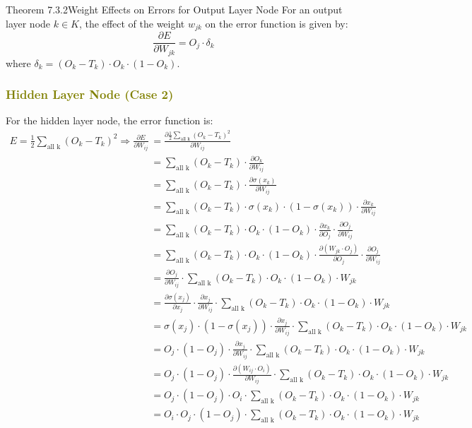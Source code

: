 \documentclass{book}
\begin{document}
\begin{thmBox}{Theorem 7.3.2}{Weight Effects on Errors for Output Layer Node}
    For an output layer node \(k \in K\), the effect of the weight \(w_{jk}\) on the error function is given by:
    \[
        \frac{\partial E}{\partial W_{jk}} =  O_j \cdot \delta_k
    \]
    where \(\delta_k = (O_k - T_k) \cdot O_k \cdot (1 - O_k)\).
\end{thmBox}
\newpage
\textcolor{olive}{\subsubsection{Hidden Layer Node (Case 2)}}
For the hidden layer node, the error function is:
\begin{align*}
    E = \frac{1}{2} \sum_{\text{all k}} (O_k - T_k)^2 \Rightarrow \frac{\partial E}{\partial W_{ij}} &= \frac{\partial \frac{1}{2} \sum_{\text{all k}} (O_k - T_k)^2}{\partial W_{ij}}\\
    &= \sum_{\text{all k}} (O_k - T_k) \cdot \frac{\partial O_k}{\partial W_{ij}}\\
    &= \sum_{\text{all k}} (O_k - T_k) \cdot \frac{\partial \sigma(x_k)}{\partial W_{ij}}\\
    &= \sum_{\text{all k}} (O_k - T_k) \cdot \sigma(x_k) \cdot (1 - \sigma(x_k)) \cdot \frac{\partial x_k}{\partial W_{ij}}\\
    &= \sum_{\text{all k}} (O_k - T_k) \cdot O_k \cdot (1 - O_k) \cdot \frac{\partial x_k}{\partial O_j} \cdot \frac{\partial O_j}{\partial W_{ij}}\\
    &= \sum_{\text{all k}} (O_k - T_k) \cdot O_k \cdot (1 - O_k) \cdot \frac{\partial (W_{jk} \cdot O_j)}{\partial O_j} \cdot \frac{\partial O_j}{\partial W_{ij}}\\
    &= \frac{\partial O_j}{\partial W_{ij}}\cdot \sum_{\text{all k}} (O_k - T_k) \cdot O_k \cdot (1 - O_k) \cdot W_{jk}  \\
    &= \frac{\partial \sigma(x_j)}{\partial x_j} \cdot \frac{\partial x_j}{\partial W_{ij}} \cdot \sum_{\text{all k}} (O_k - T_k) \cdot O_k \cdot (1 - O_k) \cdot W_{jk}  \\
    &= \sigma(x_j) \cdot (1 - \sigma(x_j)) \cdot \frac{\partial x_j}{\partial W_{ij}} \cdot \sum_{\text{all k}} (O_k - T_k) \cdot O_k \cdot (1 - O_k) \cdot W_{jk}  \\
    &= O_j \cdot (1 - O_j) \cdot \frac{\partial x_j}{\partial W_{ij}} \cdot \sum_{\text{all k}} (O_k - T_k) \cdot O_k \cdot (1 - O_k) \cdot W_{jk}  \\
    &= O_j \cdot (1 - O_j) \cdot \frac{\partial (W_{ij} \cdot O_i)}{\partial W_{ij}} \cdot \sum_{\text{all k}} (O_k - T_k) \cdot O_k \cdot (1 - O_k) \cdot W_{jk}  \\
    &= O_j \cdot (1 - O_j) \cdot O_i \cdot \sum_{\text{all k}} (O_k - T_k) \cdot O_k \cdot (1 - O_k) \cdot W_{jk}  \\
    &= O_i \cdot O_j \cdot (1 - O_j) \cdot \sum_{\text{all k}} (O_k - T_k) \cdot O_k \cdot (1 - O_k) \cdot W_{jk}
\end{align*}
\end{document}
